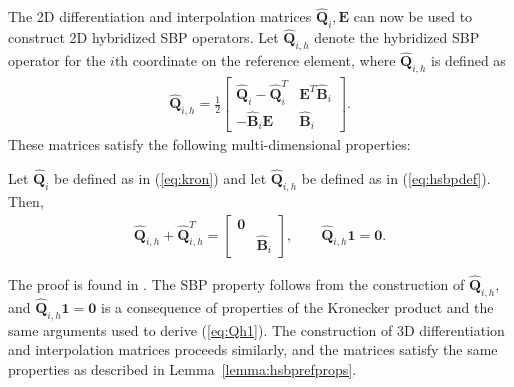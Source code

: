 \documentclass{svjour3}                     %
\renewcommand{\hat}{\widehat}
\renewcommand{\tilde}{\widetilde}
\newcommand{\td}[2]{\frac{{\rm d}#1}{{\rm d}{\rm #2}}}
\newcommand{\LRp}[1]{\left( #1 \right)}
\begin{document}
The 2D differentiation and interpolation matrices $\hat{\bm{Q}}_i, \bm{E}$ can now be used to construct 2D hybridized SBP operators.  Let $\hat{\bm{Q}}_{i,h}$ denote the hybridized SBP operator for the $i$th coordinate on the reference element, where $\hat{\bm{Q}}_{i,h}$ is defined as
\begin{align}
\hat{\bm{Q}}_{i,h} = \frac{1}{2}\begin{bmatrix}
\hat{\bm{Q}}_i - \hat{\bm{Q}}_i^T & \bm{E}^T\hat{\bm{B}}_i\\
-\hat{\bm{B}}_i\bm{E} & \hat{\bm{B}}_i
\end{bmatrix}.
\label{eq:hsbpdef}
\end{align}
These matrices satisfy the following multi-dimensional properties:
\begin{lemma}
\label{lemma:hsbprefprops}
Let $\hat{\bm{Q}}_{i}$ be defined as in (\ref{eq:kron}) and let $\hat{\bm{Q}}_{i,h}$ be defined as in (\ref{eq:hsbpdef}).  Then, 
\begin{align}
\hat{\bm{Q}}_{i,h} + \hat{\bm{Q}}_{i,h}^T = \begin{bmatrix}
\bm{0} & \\
& \hat{\bm{B}}_i
\end{bmatrix}, \qquad \hat{\bm{Q}}_{i,h}\bm{1} = \bm{0}.
\end{align}
\end{lemma}
The proof is found in \cite{chan2018efficient}.  The SBP property follows from the construction of $\hat{\bm{Q}}_{i,h}$, and $\hat{\bm{Q}}_{i,h}\bm{1} = \bm{0}$ is a consequence of properties of the Kronecker product and the same arguments used to derive (\ref{eq:Qh1}).  The construction of 3D differentiation and interpolation matrices proceeds similarly, and the matrices satisfy the same properties as described in Lemma~\ref{lemma:hsbprefprops}.  

\end{document}
